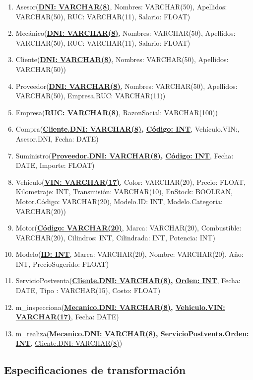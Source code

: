 \documentclass[12pt]{article}
\begin{document}
\begin{enumerate}
\item Asesor(\textbf{\underline{DNI: VARCHAR(8)}}, Nombres: VARCHAR(50), Apellidos: VARCHAR(50), RUC: VARCHAR(11), Salario: FLOAT)
\item Mecánico(\textbf{\underline{DNI: VARCHAR(8)}}, Nombres: VARCHAR(50), Apellidos: VARCHAR(50), RUC: VARCHAR(11), Salario: FLOAT)
\item Cliente(\textbf{\underline{DNI: VARCHAR(8)}}, Nombres: VARCHAR(50), Apellidos: VARCHAR(50))
\item Proveedor(\textbf{\underline{DNI: VARCHAR(8)}}, Nombres: VARCHAR(50), Apellidos: VARCHAR(50), Empresa.RUC: VARCHAR(11))
\item Empresa(\textbf{\underline{RUC: VARCHAR(8)}}, RazonSocial: VARCHAR(100))
\item Compra(\textbf{\underline{Cliente.DNI: VARCHAR(8)}, \underline{Código: INT}}, Vehículo.VIN:, Asesor.DNI, Fecha: DATE)
\item Suministro(\textbf{\underline{Proveedor.DNI: VARCHAR(8)}, \underline{Código: INT}}, Fecha: DATE, Importe: FLOAT)
\item Vehículo(\textbf{\underline{VIN: VARCHAR(17)}}, Color: VARCHAR(20), Precio: FLOAT, Kilometraje: INT, Transmisión: VARCHAR(10), EnStock: BOOLEAN, Motor.Código: VARCHAR(20), Modelo.ID: INT, Modelo.Categoria: VARCHAR(20))
\item Motor(\textbf{\underline{Código: VARCHAR(20)}}, Marca: VARCHAR(20), Combustible: VARCHAR(20), Cilindros: INT, Cilindrada: INT, Potencia: INT)
\item Modelo(\textbf{\underline{ID: INT}}, Marca: VARCHAR(20), Nombre: VARCHAR(20), Año: INT, PrecioSugerido: FLOAT)
\item ServicioPostventa(\textbf{\underline{Cliente.DNI: VARCHAR(8)}, \underline{Orden: INT}}, Fecha: DATE, Tipo : VARCHAR(15), Costo: FLOAT)
\item m\_inspecciona(\textbf{\underline{Mecanico.DNI: VARCHAR(8)}, \underline{Vehiculo.VIN: VARCHAR(17)}}, Fecha: DATE)
\item m\_realiza(\textbf{\underline{Mecanico.DNI: VARCHAR(8)}, \underline{ServicioPostventa.Orden: INT}}, \underline{Cliente.DNI: VARCHAR(8)})
\end{enumerate}

\newpage

\subsection{Especificaciones de transformaci\'on}
\end{document}
